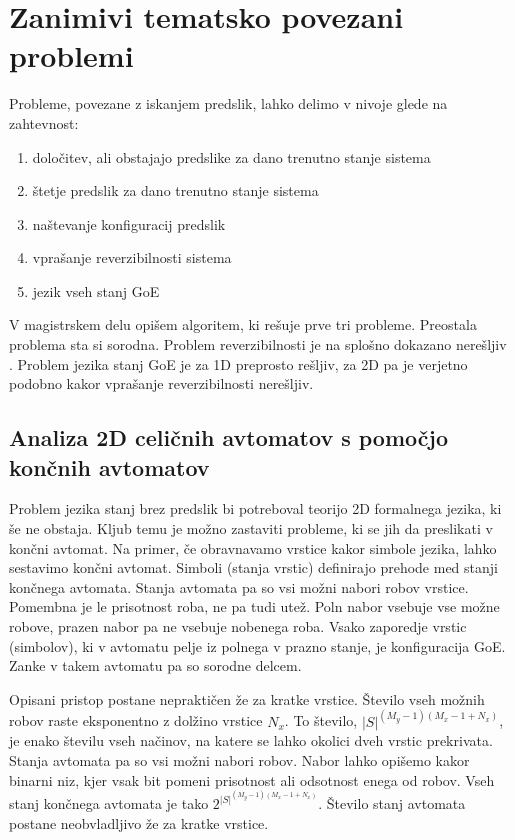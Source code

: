 \documentclass[12pt,a4paper,openany,twoside]{book}
\begin{document}
\section{Zanimivi tematsko povezani problemi}

Probleme, povezane z iskanjem predslik, lahko delimo v nivoje glede na zahtevnost:
\begin{enumerate}
\item določitev, ali obstajajo predslike za dano trenutno stanje sistema
\item štetje predslik za dano trenutno stanje sistema
\item naštevanje konfiguracij predslik
\item vprašanje reverzibilnosti sistema
\item jezik vseh stanj GoE
\end{enumerate}

V magistrskem delu opišem algoritem, ki rešuje prve tri probleme.
Preostala problema sta si sorodna.
Problem reverzibilnosti je na splošno dokazano nerešljiv \cite{Kari1989}.
Problem jezika stanj GoE je za 1D preprosto rešljiv, za 2D pa je
verjetno podobno kakor vprašanje reverzibilnosti nerešljiv.

\subsection{Analiza 2D celičnih avtomatov s pomočjo končnih avtomatov}

Problem jezika stanj brez predslik bi potreboval teorijo 2D formalnega jezika, ki še ne obstaja.
Kljub temu je možno zastaviti probleme, ki se jih da preslikati v končni avtomat.
Na primer, če obravnavamo vrstice kakor simbole jezika, lahko sestavimo končni avtomat.
Simboli (stanja vrstic) definirajo prehode med stanji končnega avtomata. Stanja avtomata pa
so vsi možni nabori robov vrstice. Pomembna je le prisotnost roba, ne pa tudi utež.
Poln nabor vsebuje vse možne robove, prazen nabor pa ne vsebuje nobenega roba.
Vsako zaporedje vrstic (simbolov), ki v avtomatu pelje iz polnega v prazno stanje, je konfiguracija GoE.
Zanke v takem avtomatu pa so sorodne delcem.

Opisani pristop postane nepraktičen že za kratke vrstice.
Število vseh možnih robov raste eksponentno z dolžino vrstice \(N_x\).
To število, \(|S|^{(M_y-1)(M_x-1+N_x)}\), je enako številu vseh načinov,
na katere se lahko okolici dveh vrstic prekrivata.
Stanja avtomata pa so vsi možni nabori robov.
Nabor lahko opišemo kakor binarni niz, kjer vsak bit pomeni
prisotnost ali odsotnost enega od robov.
Vseh stanj končnega avtomata je tako \(2^{ |S|^{(M_y-1)(M_x-1+N_x)} }\).
Število stanj avtomata postane neobvladljivo že za kratke vrstice.
\end{document}
